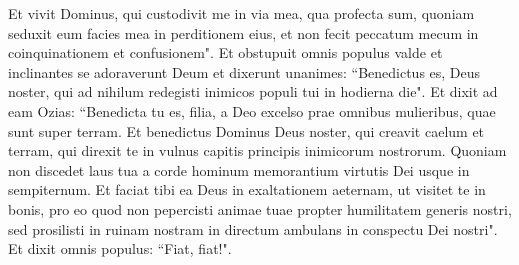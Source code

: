 \begin{biblechapter}
\verse Et vivit Dominus, qui custodivit me in via mea, qua profecta sum, quoniam seduxit eum facies mea in perditionem eius, et non fecit peccatum mecum in coinquinationem et confusionem". 
\verse Et obstupuit omnis populus valde et inclinantes se adoraverunt Deum et dixerunt unanimes: “Benedictus es, Deus noster, qui ad nihilum redegisti inimicos populi tui in hodierna die". 
\verse Et dixit ad eam Ozias: “Benedicta tu es, filia, a Deo excelso prae omnibus mulieribus, quae sunt super terram. Et benedictus Dominus Deus noster, qui creavit caelum et terram, qui direxit te in vulnus capitis principis inimicorum nostrorum. 
\verse Quoniam non discedet laus tua a corde hominum memorantium virtutis Dei usque in sempiternum. 
\verse Et faciat tibi ea Deus in exaltationem aeternam, ut visitet te in bonis, pro eo quod non pepercisti animae tuae propter humilitatem generis nostri, sed prosilisti in ruinam nostram in directum ambulans in conspectu Dei nostri". Et dixit omnis populus: “Fiat, fiat!". 
\end{biblechapter}

